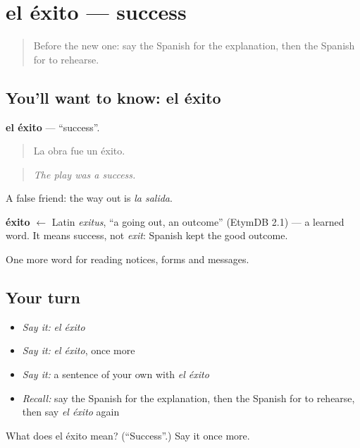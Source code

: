 \section[el éxito]{el éxito — success}

\label{lesson:ES-C505-exito}



\begin{quote}
Before the new one: say the Spanish for the explanation, then the Spanish for to rehearse.
\end{quote}

\subsection*{You'll want to know: el éxito}
\textbf{el éxito} — \textquotedblleft{}success\textquotedblright{}.

\begin{quote}
La obra fue un éxito.
\end{quote}

\begin{quote}
\emph{The play was a success.}
\end{quote}

A false friend: the way out is \emph{la salida}.

\begin{cousinweb}
\textbf{éxito} $\leftarrow$ Latin \emph{exitus}, \textquotedblleft{}a going out, an outcome\textquotedblright{} (EtymDB 2.1) — a learned word. It means success, not \emph{exit}: Spanish kept the good outcome.
\end{cousinweb}

\begin{grammarlens}[title={What you've built}]
One more word for reading notices, forms and messages.
\end{grammarlens}

\subsection*{Your turn}
\begin{itemize}
\raggedright
  \item \emph{Say it:} \emph{el éxito}
  \item \emph{Say it:} \emph{el éxito}, once more
  \item \emph{Say it:} a sentence of your own with \emph{el éxito}
  \item \emph{Recall:} say the Spanish for the explanation, then the Spanish for to rehearse, then say \emph{el éxito} again
\end{itemize}

\begin{tcolorbox}[breakable,colback=teal!4,colframe=teal!35!black,title={Before you move on}]
What does el éxito mean? (\textquotedblleft{}Success\textquotedblright{}.) Say it once more.
\end{tcolorbox}

